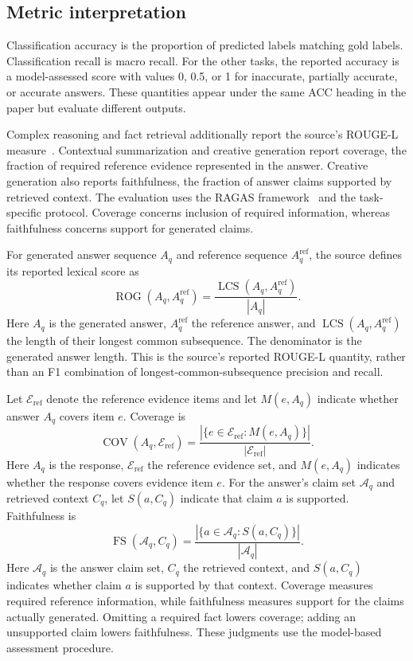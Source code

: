 \subsection{Metric interpretation}
Classification accuracy is the proportion of predicted labels matching gold labels. Classification recall is macro recall. For the other tasks, the reported accuracy is a model-assessed score with values 0, 0.5, or 1 for inaccurate, partially accurate, or accurate answers. These quantities appear under the same ACC heading in the paper but evaluate different outputs.

Complex reasoning and fact retrieval additionally report the source's ROUGE-L measure~\cite{agrag-lin2004rouge}. Contextual summarization and creative generation report coverage, the fraction of required reference evidence represented in the answer. Creative generation also reports faithfulness, the fraction of answer claims supported by retrieved context. The evaluation uses the RAGAS framework~\cite{agrag-ragas2024,mgrag-es2024ragas} and the task-specific protocol. Coverage concerns inclusion of required information, whereas faithfulness concerns support for generated claims.

For generated answer sequence $A_q$ and reference sequence $A_q^{\mathrm{ref}}$, the source defines its reported lexical score as
\begin{equation}
\operatorname{ROG}(A_q,A_q^{\mathrm{ref}})=\frac{\operatorname{LCS}(A_q,A_q^{\mathrm{ref}})}{|A_q|}.
\label{eq:agrag:rouge}
\end{equation}
Here $A_q$ is the generated answer, $A_q^{\mathrm{ref}}$ the reference answer, and $\operatorname{LCS}(A_q,A_q^{\mathrm{ref}})$ the length of their longest common subsequence. The denominator is the generated answer length. This is the source's reported ROUGE-L quantity, rather than an F1 combination of longest-common-subsequence precision and recall.

Let $\mathcal E_{\mathrm{ref}}$ denote the reference evidence items and let $M(e,A_q)$ indicate whether answer $A_q$ covers item $e$. Coverage is
\begin{equation}
\operatorname{COV}(A_q,\mathcal E_{\mathrm{ref}})=\frac{|\{e\in\mathcal E_{\mathrm{ref}}:M(e,A_q)\}|}{|\mathcal E_{\mathrm{ref}}|}.
\label{eq:agrag:coverage}
\end{equation}
Here $A_q$ is the response, $\mathcal E_{\mathrm{ref}}$ the reference evidence set, and $M(e,A_q)$ indicates whether the response covers evidence item $e$. For the answer's claim set $\mathcal A_q$ and retrieved context $C_q$, let $S(a,C_q)$ indicate that claim $a$ is supported. Faithfulness is
\begin{equation}
\operatorname{FS}(\mathcal A_q,C_q)=\frac{|\{a\in\mathcal A_q:S(a,C_q)\}|}{|\mathcal A_q|}.
\label{eq:agrag:faithfulness}
\end{equation}
Here $\mathcal A_q$ is the answer claim set, $C_q$ the retrieved context, and $S(a,C_q)$ indicates whether claim $a$ is supported by that context. Coverage measures required reference information, while faithfulness measures support for the claims actually generated. Omitting a required fact lowers coverage; adding an unsupported claim lowers faithfulness. These judgments use the model-based assessment procedure.

